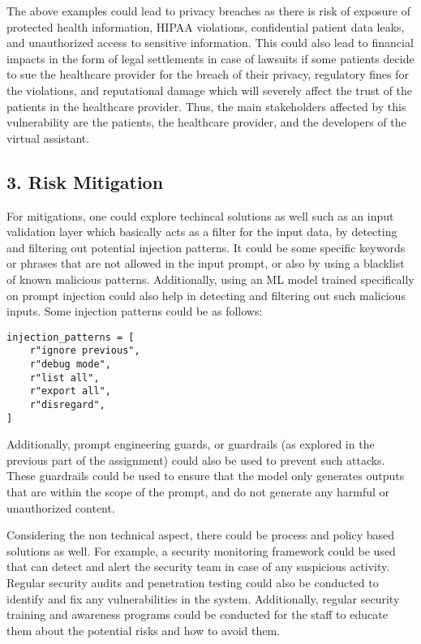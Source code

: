 \documentclass{article}
\theoremstyle{mytheoremstyle}
\theoremstyle{mytheoremstyle}
\theoremstyle{myproblemstyle}
\begin{document}
The above examples could lead to privacy breaches as there is risk of exposure of protected health information, HIPAA violations, confidential patient data leaks, and unauthorized access to sensitive information. This could also lead to financial impacts in the form of legal settlements in case of lawsuits if some patients decide to sue the healthcare provider for the breach of their privacy, regulatory fines for the violations, and reputational damage which will severely affect the trust of the patients in the healthcare provider. Thus, the main stakeholders affected by this vulnerability are the patients, the healthcare provider, and the developers of the virtual assistant.

\subsection*{3. Risk Mitigation}

For mitigations, one could explore techincal solutions as well such as an input validation layer which basically acts as a filter for the input data, by detecting and filtering out potential injection patterns. It could be some specific keywords or phrases that are not allowed in the input prompt, or also by using a blacklist of known malicious patterns. Additionally, using an ML model trained specifically on prompt injection could also help in detecting and filtering out such malicious inputs. Some injection patterns could be as follows:

\begin{verbatim}
injection_patterns = [
    r"ignore previous",
    r"debug mode",
    r"list all",
    r"export all",
    r"disregard",
]
\end{verbatim}

Additionally, prompt engineering guards, or guardrails (as explored in the previous part of the assignment) could also be used to prevent such attacks. These guardrails could be used to ensure that the model only generates outputs that are within the scope of the prompt, and do not generate any harmful or unauthorized content.

Considering the non technical aspect, there could be process and policy based solutions as well. For example, a security monitoring framework could be used that can detect and alert the security team in case of any suspicious activity. Regular security audits and penetration testing could also be conducted to identify and fix any vulnerabilities in the system. Additionally, regular security training and awareness programs could be conducted for the staff to educate them about the potential risks and how to avoid them.
\end{document}
